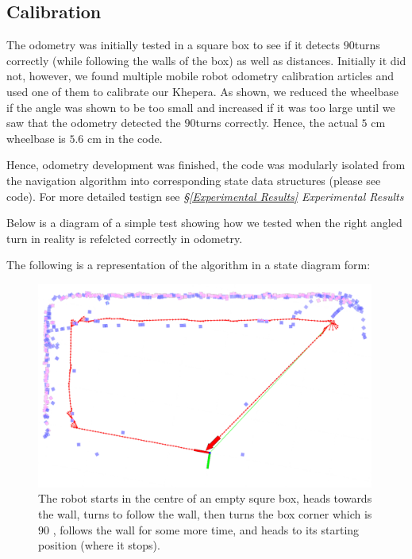 \documentclass[11pt, a4paper]{article}
\begin{document}
\subsection{Calibration}

The odometry was initially tested in a square box to see if it detects $90$\degree turns correctly 
(while following the walls of the box) as well as distances. Initially it did not, however, we 
found multiple mobile robot odometry calibration articles and used one of them\cite{odo_calibration}
 to calibrate our Khepera. As shown, we reduced the wheelbase if the angle was shown to be too small 
and increased if it was too large until we saw that the odometry detected the  $90$\degree turns correctly. 
Hence, the actual $5$ cm wheelbase is $5.6$ cm in the code.

Hence, odometry development was finished, the code was modularly isolated from the navigation algorithm 
into corresponding state data structures (please see code). For more detailed testign see 
\textit{\S\ref{Experimental Results} Experimental Results}

Below is a diagram of a simple test showing how we tested when the right angled turn in reality is 
refelcted correctly in odometry.

The following is a representation of the algorithm in a state diagram form:
\begin{figure}[h]
  \begin{center}
    \includegraphics[width=30em]{../assets/right-angle-calibration.png}
    \caption{The robot starts in the centre of an empty squre box, heads towards the wall, turns to follow the wall, then turns the box corner which is $90$ \degree, follows the wall for some more time, and heads to its starting position (where it stops).}
  \end{center}
\end{figure} 
\end{document}
